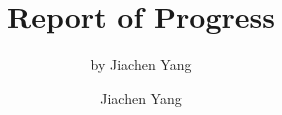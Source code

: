 
\usepackage{tikz} 
\usepackage{mathptmx}
\usepackage[T1]{fontenc}
\usepackage[latin1]{inputenc}
\usepackage{color}
\usepackage{amsmath}
\usepackage{amssymb}

\usepackage{listings}

\def\beamer@linkspace#1{%
  \begin{pgfpicture}{0pt}{-1.5pt}{#1}{5.5pt}
    \pgfsetfillopacity{0}
    \pgftext[x=0pt,y=-1.5pt]{.}
    \pgftext[x=#1,y=5.5pt]{.}
  \end{pgfpicture}}


\usepackage[english]{babel}


\graphicspath{{figure/}}



\newcommand{\br}[0]{\par\vskip15pt\par}




\title[report]{Report of Progress}


\subtitle{by Jiachen Yang}

\author[jc-yang]{
	Jiachen Yang 
}




\frame{\maketitle}





